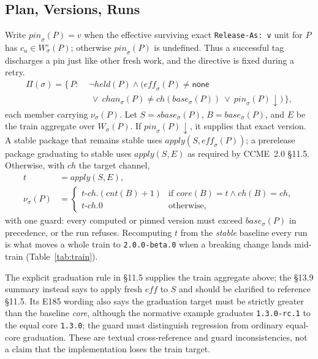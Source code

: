 \documentclass[sigconf,nonacm]{acmart}
\newcommand{\code}[1]{\texttt{#1}}
\begin{document}
\subsection{Plan, Versions, Runs}

\begin{definition}
\label{def:plan}
Write $\mathit{pin}_\sigma(P)=v$ when the effective surviving exact
\code{Release-As: v} unit for $P$ has $c_u\in W^\circ_\sigma(P)$; otherwise
$\mathit{pin}_\sigma(P)$ is undefined. Thus a successful tag discharges a
pin just like other fresh work, and the directive is fixed during a retry.
\begin{equation}
\begin{aligned}
  \Pi(\sigma) = \{\, P :\;
    &\lnot\mathit{held}(P) \wedge (\mathit{eff}_\sigma(P) \neq
     \mathsf{none} \\[-1mm]
    &\ \lor\ \mathit{chan}_\sigma(P) \neq
     \mathit{ch}(\mathit{base}_\sigma(P))
     \ \lor\ \mathit{pin}_\sigma(P)\downarrow) \,\},
\end{aligned}
\end{equation}
each member carrying $\nu_\sigma(P)$. Let $S=\mathit{sbase}_\sigma(P)$,
$B=\mathit{base}_\sigma(P)$, and $E$ be the train aggregate over $W_\sigma(P)$.
If $\mathit{pin}_\sigma(P)\downarrow$, it supplies that exact version. A stable package that
remains stable uses $\mathit{apply}(S,\mathit{eff}_\sigma(P))$; a prerelease
package graduating to stable uses $\mathit{apply}(S,E)$ as required by
CCME~2.0 \S11.5. Otherwise, with $\mathit{ch}$ the target channel,
\begin{equation}
\label{eq:train}
\begin{aligned}
  t &= \mathit{apply}(S, E), \\
  \nu_\sigma(P) &=
  \begin{cases}
    t\text{-}\mathit{ch}.(\mathit{cnt}(B){+}1)
      & \text{if } \mathit{core}(B) = t \wedge \mathit{ch}(B) =
        \mathit{ch},\\
    t\text{-}\mathit{ch}.0 & \text{otherwise,}
  \end{cases}
\end{aligned}
\end{equation}
with one guard: every computed or pinned version must exceed
$\mathit{base}_\sigma(P)$ in precedence, or the run refuses. Recomputing
$t$ from the \emph{stable} baseline every run is what moves a whole
train to \code{2.0.0-beta.0} when a breaking change lands mid-train
(Table~\ref{tab:train}).

The explicit graduation rule in \S11.5 supplies the train aggregate above;
the \S13.9 summary instead says to apply fresh $\mathit{eff}$ to $S$ and
should be clarified to reference \S11.5. Its E185 wording also says the
graduation target must be strictly greater than the baseline \emph{core},
although the normative example graduates \code{1.3.0-rc.1} to the equal core
\code{1.3.0}; the guard must distinguish regression from ordinary equal-core
graduation. These are textual cross-reference and guard inconsistencies, not
a claim that the implementation loses the train target.
\end{definition}
\end{document}
